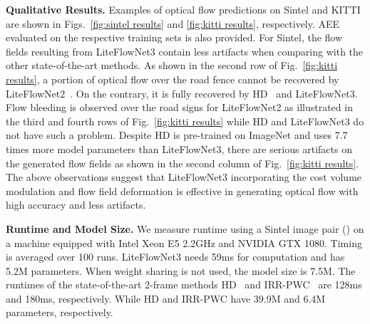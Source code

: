 \documentclass[runningheads]{llncs}
\begin{document}
\noindent\textbf{Qualitative Results.} Examples of optical flow predictions on Sintel and KITTI are shown in Figs.~\ref{fig:sintel results} and \ref{fig:kitti results}, respectively. AEE evaluated on the respective training sets is also provided. 
For Sintel, the flow fields resulting from LiteFlowNet3 contain less artifacts when comparing with the other state-of-the-art methods.
As shown in the second row of Fig.~\ref{fig:kitti results}, a portion of optical flow over the road fence cannot be recovered by LiteFlowNet2~\cite{Hui20}. On the contrary, it is fully recovered by HD~\cite{Yin19} and LiteFlowNet3.
Flow bleeding is observed over the road signs for LiteFlowNet2 as illustrated in the third and fourth rows of Fig.~\ref{fig:kitti results} while HD and LiteFlowNet3 do not have such a problem.
Despite HD is pre-trained on ImageNet and uses 7.7 times more model parameters than LiteFlowNet3, there are serious artifacts on the generated flow fields as shown in the second column of Fig.~\ref{fig:kitti results}. 
The above observations suggest that LiteFlowNet3 incorporating the cost volume modulation and flow field deformation is effective in generating optical flow with high accuracy and less artifacts.

\noindent\textbf{Runtime and Model Size.} We measure runtime using a Sintel image pair () on a machine equipped with Intel Xeon E5 2.2GHz and NVIDIA GTX 1080. Timing is averaged over 100 runs. LiteFlowNet3 needs 59ms for computation and has 5.2M parameters. When weight sharing is not used, the model size is 7.5M. The runtimes of the state-of-the-art 2-frame methods HD~\cite{Yin19} and IRR-PWC~\cite{Hur19} are 128ms and 180ms, respectively. While HD and IRR-PWC have 39.9M and 6.4M parameters, respectively. 
\end{document}
